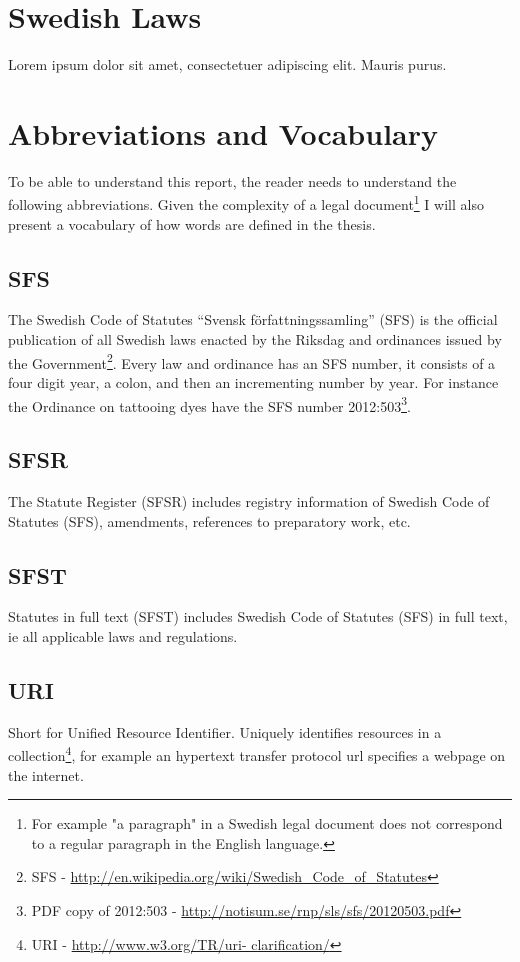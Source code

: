 \documentclass[a4paper,11pt]{kth-mag}
\begin{document}
\section{Swedish Laws}
Lorem ipsum dolor sit amet, consectetuer adipiscing elit. Mauris
purus. 

\section{Abbreviations and Vocabulary} To be able to understand this report,
the reader needs to understand the following abbreviations. Given the
complexity of a legal document\footnote{For example "a paragraph" in a Swedish
legal document does not correspond to a regular paragraph in the English
language.} I will also present a vocabulary of how words are defined in the
thesis.

\subsection*{SFS} The Swedish Code of Statutes “Svensk författningssamling”
(SFS) is the official publication of all Swedish laws enacted by the Riksdag
and ordinances issued by the Government\footnote{SFS -
\url{http://en.wikipedia.org/wiki/Swedish_Code_of_Statutes}}. Every law and
ordinance has an SFS number, it consists of a four digit year, a colon, and
then an incrementing number by year. For instance the Ordinance on tattooing
dyes have the SFS number 2012:503\footnote{PDF copy of 2012:503 -
\url{http://notisum.se/rnp/sls/sfs/20120503.pdf}}.

\subsection*{SFSR}
The Statute Register (SFSR) includes registry information of Swedish Code
of Statutes (SFS), amendments, references to preparatory work, etc.

\subsection*{SFST}
Statutes in full text (SFST) includes Swedish Code of Statutes (SFS) in
full text, ie all applicable laws and regulations.

\subsection*{URI} Short for Unified Resource Identifier. Uniquely identifies
resources in a collection\footnote{URI - \url{http://www.w3.org/TR/uri-
clarification/}}, for example an hypertext transfer protocol url specifies a
webpage on the internet.
\end{document}
